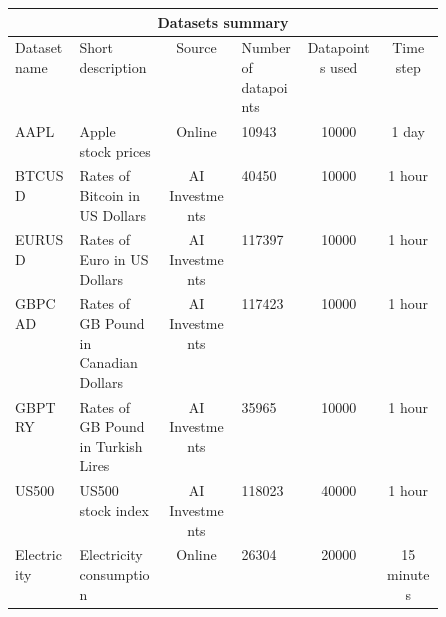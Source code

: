 \begin{center}
	\begin{tabular}{||p{0.15\linewidth} ||p{0.2\linewidth} | c | p{0.15\linewidth} | c | c ||}
		\hline
		\multicolumn{6}{|c|}{Datasets summary}                                                                                                         \\
		\hline
		Dataset name & Short description                      & Source                           & Number of datapoints & Datapoints used & Time step  \\ [0.5ex]
		\hline\hline
		AAPL         & Apple stock prices                     & Online \cite{apple_source}       & 10943                & 10000           & 1 day      \\
		\hline
		BTCUSD       & Rates of Bitcoin in US Dollars         & AI Investments                   & 40450                & 10000           & 1 hour     \\
		\hline
		EURUSD       & Rates of Euro in US Dollars            & AI Investments                   & 117397               & 10000           & 1 hour     \\
		\hline
		GBPCAD       & Rates  of GB Pound in Canadian Dollars & AI Investments                   & 117423               & 10000           & 1 hour     \\
		\hline
		GBPTRY       & Rates of GB Pound in Turkish Lires     & AI Investments                   & 35965                & 10000           & 1 hour     \\
		\hline
		US500        & US500 stock index                      & AI Investments                   & 118023               & 40000           & 1 hour     \\
		\hline
		Electricity  & Electricity consumption                & Online \cite{electricity_source} & 26304                & 20000           & 15 minutes \\[1ex]
		\hline
	\end{tabular}
\end{center}

